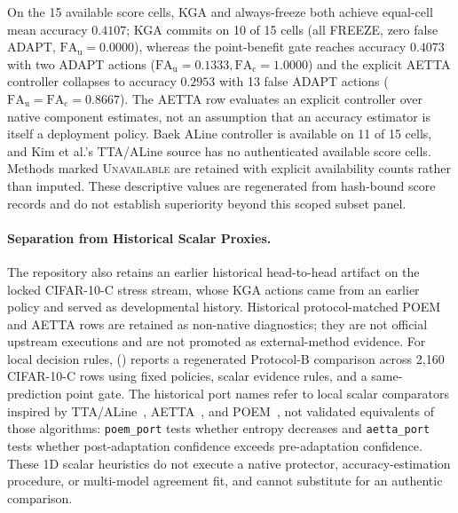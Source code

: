 On the 15 available score cells, KGA and always-freeze both achieve equal-cell mean accuracy $0.4107$;
KGA commits on 10 of 15 cells (all FREEZE, zero false ADAPT, $\mathrm{FA}_{\mathrm u} = 0.0000$), whereas
the point-benefit gate reaches accuracy $0.4073$ with two ADAPT actions ($\mathrm{FA}_{\mathrm u} = 0.1333,
\mathrm{FA}_{\mathrm c} = 1.0000$) and the explicit AETTA controller collapses to accuracy $0.2953$ with 13
false ADAPT actions ($\mathrm{FA}_{\mathrm u} = \mathrm{FA}_{\mathrm c} = 0.8667$). The AETTA row evaluates
an explicit controller over native component estimates, not an assumption that an accuracy estimator is
itself a deployment policy. Baek ALine controller is available on 11 of 15 cells, and Kim et al.'s TTA/ALine
source has no authenticated available score cells. Methods marked \textsc{Unavailable} are retained with
explicit availability counts rather than imputed. These descriptive values are regenerated from hash-bound
score records and do not establish superiority beyond this scoped subset panel.

\paragraph{Separation from Historical Scalar Proxies.}
The repository also retains an earlier historical head-to-head artifact on the locked CIFAR-10-C stress stream,
whose KGA actions came from an earlier policy and served as developmental history. Historical protocol-matched
POEM and AETTA rows are retained as non-native diagnostics; they are not official upstream executions and are
not promoted as external-method evidence. For local decision rules, 
() reports a regenerated
Protocol-B comparison across 2,160 CIFAR-10-C rows using fixed policies, scalar evidence rules, and a
same-prediction point gate.
The historical port names refer to local scalar comparators inspired by TTA/ALine~\cite{kim2024ttaline},
AETTA~\cite{lee2024aetta}, and POEM~\cite{bar2024poem}, not validated equivalents of those algorithms:
\texttt{poem\_port} tests whether entropy decreases and \texttt{aetta\_port} tests whether post-adaptation
confidence exceeds pre-adaptation confidence. These 1D scalar heuristics do not execute a native protector,
accuracy-estimation procedure, or multi-model agreement fit, and cannot substitute for an authentic comparison.

